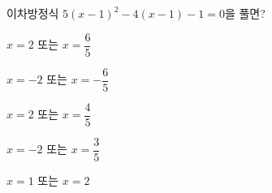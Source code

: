이차방정식 $5(x-1)^2-4(x-1)-1=0$을 풀면?
\begin{choicesii}{\rule[-3ex]{0pt}{8ex}$x=2$ 또는 $x=\dfrac{6}{5}$}{\rule[-3ex]{0pt}{8ex}$x=-2$ 또는 $x=-\dfrac{6}{5}$}{\rule[-3ex]{0pt}{8ex}$x=2$ 또는 $x=\dfrac{4}{5}$}{\rule[-3ex]{0pt}{8ex}$x=-2$ 또는 $x=\dfrac{3}{5}$}{\rule[-3ex]{0pt}{8ex}$x=1$ 또는 $x=2$}\end{choicesii}
